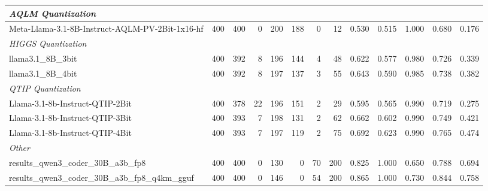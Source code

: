 \begin{table}[htbp]
{\begin{tabular}{lrrrrrrrrrrrr}
    \multicolumn{13}{l}{\textit{AQLM Quantization}} \\
    \midrule
    Meta-Llama-3.1-8B-Instruct-AQLM-PV-2Bit-1x16-hf & 400 & 400 & 0 & 200 & 188 & 0 & 12 & 0.530 & 0.515 & 1.000 & 0.680 & 0.176 \\
    \midrule
    \multicolumn{13}{l}{\textit{HIGGS Quantization}} \\
    \midrule
    llama3.1\_8B\_3bit & 400 & 392 & 8 & 196 & 144 & 4 & 48 & 0.622 & 0.577 & 0.980 & 0.726 & 0.339 \\
    llama3.1\_8B\_4bit & 400 & 392 & 8 & 197 & 137 & 3 & 55 & 0.643 & 0.590 & 0.985 & 0.738 & 0.382 \\
    \midrule
    \multicolumn{13}{l}{\textit{QTIP Quantization}} \\
    \midrule
    Llama-3.1-8b-Instruct-QTIP-2Bit & 400 & 378 & 22 & 196 & 151 & 2 & 29 & 0.595 & 0.565 & 0.990 & 0.719 & 0.275 \\
    Llama-3.1-8b-Instruct-QTIP-3Bit & 400 & 393 & 7 & 198 & 131 & 2 & 62 & 0.662 & 0.602 & 0.990 & 0.749 & 0.421 \\
    Llama-3.1-8b-Instruct-QTIP-4Bit & 400 & 393 & 7 & 197 & 119 & 2 & 75 & 0.692 & 0.623 & 0.990 & 0.765 & 0.474 \\
    \midrule
    \multicolumn{13}{l}{\textit{Other}} \\
    \midrule
    results\_qwen3\_coder\_30B\_a3b\_fp8 & 400 & 400 & 0 & 130 & 0 & 70 & 200 & 0.825 & 1.000 & 0.650 & 0.788 & 0.694 \\
    results\_qwen3\_coder\_30B\_a3b\_fp8\_q4km\_gguf & 400 & 400 & 0 & 146 & 0 & 54 & 200 & 0.865 & 1.000 & 0.730 & 0.844 & 0.758 \\
    \bottomrule
  \end{tabular}
  }
\end{table}

